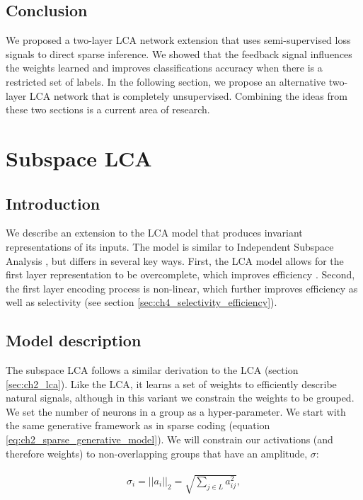 \subsection{Conclusion}
We proposed a two-layer LCA network extension that uses semi-supervised loss signals to direct sparse inference. We showed that the feedback signal influences the weights learned and improves classifications accuracy when there is a restricted set of labels. In the following section, we propose an alternative two-layer LCA network that is completely unsupervised. Combining the ideas from these two sections is a current area of research.

\section{Subspace LCA}\label{sec:ch3_subspace_lca}
\subsection{Introduction}
We describe an extension to the LCA model that produces invariant representations of its inputs. The model is similar to Independent Subspace Analysis \parencite{hyvarinen2000emergence}, but differs in several key ways. First, the LCA model allows for the first layer representation to be overcomplete, which improves efficiency \parencite{lewicki2000learning}. Second, the first layer encoding process is non-linear, which further improves efficiency as well as selectivity (see section \ref{sec:ch4_selectivity_efficiency}).

\subsection{Model description}
The subspace LCA follows a similar derivation to the LCA (section \ref{sec:ch2_lca}). Like the LCA, it learns a set of weights to efficiently describe natural signals, although in this variant we constrain the weights to be grouped. We set the number of neurons in a group as a hyper-parameter. We start with the same generative framework as in sparse coding (equation \ref{eq:ch2_sparse_generative_model}). We will constrain our activations (and therefore weights) to non-overlapping groups that have an amplitude, $\sigma$:

\begin{align}\label{eq:ch3_a_decomp}
\begin{split}
  \sigma_{i} = ||a_{i}||_{2} = \sqrt{\sum_{j\in L}a^{2}_{ij}},
\end{split}
\end{align}

